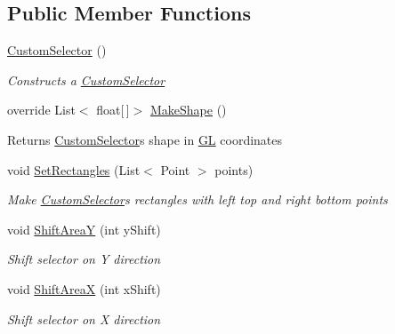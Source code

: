 \subsection*{Public Member Functions}
\begin{DoxyCompactItemize}
\item 
\mbox{\hyperlink{class_space_v_i_l_1_1_custom_selector_a2155b3189305ddeff267837382bb6cf1}{Custom\+Selector}} ()
\begin{DoxyCompactList}\small\item\em Constructs a \mbox{\hyperlink{class_space_v_i_l_1_1_custom_selector}{Custom\+Selector}} \end{DoxyCompactList}\item 
\mbox{\label{class_space_v_i_l_1_1_custom_selector_a311cdfa5ba65ce19c5c55aa29d47ec16}} 
override List$<$ float\mbox{[}$\,$\mbox{]}$>$ \mbox{\hyperlink{class_space_v_i_l_1_1_custom_selector_a311cdfa5ba65ce19c5c55aa29d47ec16}{Make\+Shape}} ()
\begin{DoxyCompactList}\small\item\em \begin{DoxyReturn}{Returns}
\mbox{\hyperlink{class_space_v_i_l_1_1_custom_selector}{Custom\+Selector}}\textquotesingle{}s shape in \mbox{\hyperlink{namespace_g_l}{GL}} coordinates 
\end{DoxyReturn}
\end{DoxyCompactList}\item 
void \mbox{\hyperlink{class_space_v_i_l_1_1_custom_selector_a1825b8c1649b4794d2473674db0f0b09}{Set\+Rectangles}} (List$<$ Point $>$ points)
\begin{DoxyCompactList}\small\item\em Make \mbox{\hyperlink{class_space_v_i_l_1_1_custom_selector}{Custom\+Selector}}\textquotesingle{}s rectangles with left top and right bottom points \end{DoxyCompactList}\item 
void \mbox{\hyperlink{class_space_v_i_l_1_1_custom_selector_a15a5e74c4b53829cd7018a15929c9aeb}{Shift\+AreaY}} (int y\+Shift)
\begin{DoxyCompactList}\small\item\em Shift selector on Y direction \end{DoxyCompactList}\item 
void \mbox{\hyperlink{class_space_v_i_l_1_1_custom_selector_a08f268e6bae2b8b270b068a5a2754d0f}{Shift\+AreaX}} (int x\+Shift)
\begin{DoxyCompactList}\small\item\em Shift selector on X direction \end{DoxyCompactList}\end{DoxyCompactItemize}
